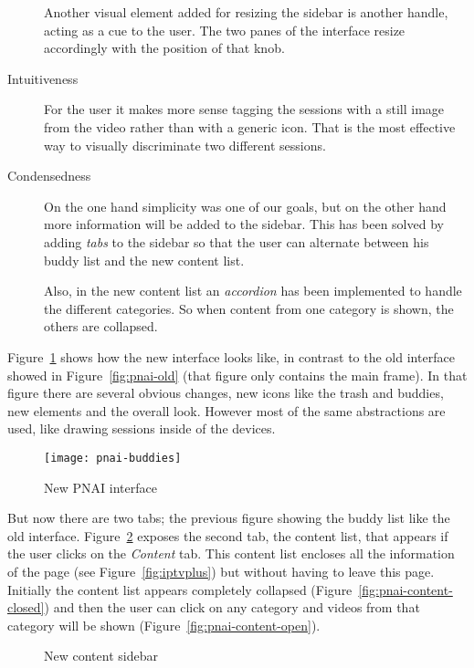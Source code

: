 \begin{description}
  Another visual element added for resizing the sidebar is another handle, acting as a cue to the user.
  The two panes of the interface resize accordingly with the position of that knob.
  \item[Intuitiveness] For the user it makes more sense tagging the sessions with a still image from the video rather than with a generic icon.
  That is the most effective way to visually discriminate two different sessions.
  \item[Condensedness] On the one hand simplicity was one of our goals, but on the other hand more information will be added to the sidebar.
  This has been solved by adding \emph{tabs} to the sidebar so that the user can alternate between his buddy list and the new content list.
  
  Also, in the new content list an \emph{accordion} has been implemented to handle the different categories.
  So when content from one category is shown, the others are collapsed.
\end{description}

Figure~\ref{fig:pnai-buddies} shows how the new interface looks like, in contrast to the old interface showed in Figure~\ref{fig:pnai-old} (that figure only contains the main frame).
In that figure there are several obvious changes, new icons like the trash and buddies, new elements and the overall look.
However most of the same abstractions are used, like drawing sessions inside of the devices.

\begin{figure}[htbp]
  \centering
    \texttt{[image: pnai-buddies]}
  \caption{New PNAI interface}
  \label{fig:pnai-buddies}
\end{figure}

But now there are two tabs; the previous figure showing the buddy list like the old interface.
Figure~\ref{fig:pnai-content} exposes the second tab, the content list, that appears if the user clicks on the \emph{Content} tab.
This content list encloses all the information of the  page (see Figure~\ref{fig:iptvplus}) but without having to leave this page.
Initially the content list appears completely collapsed (Figure~\ref{fig:pnai-content-closed}) and then the user can click on any category and videos from that category will be shown (Figure~\ref{fig:pnai-content-open}).

\begin{figure}[htbp]
  \centering
  \caption{New content sidebar}
  \label{fig:pnai-content}
\end{figure}

